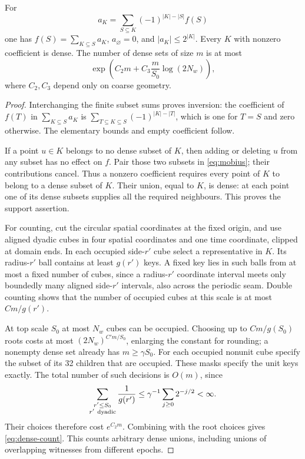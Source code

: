 \begin{lemma}
\label{lem:dense-count}
For
\begin{equation}\label{eq:mobius}
 a_K=\sum_{S\subseteq K}(-1)^{|K|-|S|}f(S)
\end{equation}
one has \(f(S)=\sum_{K\subseteq S}a_K\),
\(a_\varnothing=0\), and \(|a_K|\le2^{|K|}\).
Every \(K\) with nonzero coefficient is dense.
The number of dense sets of size \(m\) is at most
\begin{equation}\label{eq:dense-count}
 \exp\left(C_2m+C_3\frac{m}{S_0}\log(2N_w)\right),
\end{equation}
where \(C_2,C_3\) depend only on coarse geometry.
\end{lemma}
\begin{proof}
Interchanging the finite subset sums proves inversion:
the coefficient of \(f(T)\) in \(\sum_{K\subseteq S}a_K\)
is \(\sum_{T\subseteq K\subseteq S}(-1)^{|K|-|T|}\),
which is one for \(T=S\) and zero otherwise.
The elementary bounds and empty coefficient follow.

If a point \(u\in K\) belongs to no dense subset of \(K\),
then adding or deleting \(u\) from any subset has no
effect on \(f\). Pair those two subsets in
\eqref{eq:mobius}; their contributions cancel.
Thus a nonzero coefficient requires every point of \(K\)
to belong to a dense subset of \(K\).
Their union, equal to \(K\), is dense: at each point
one of its dense subsets supplies all the required
neighbours. This proves the support assertion.

For counting, cut the circular spatial coordinates at the
fixed origin, and use aligned dyadic cubes in four spatial
coordinates and one time coordinate, clipped at domain ends.
In each occupied side-\(r'\) cube select a representative
in \(K\). Its radius-\(r'\) ball contains at least \(g(r')\)
keys. A fixed key lies in such balls from at most a fixed
number of cubes, since a radius-\(r'\) coordinate interval
meets only boundedly many aligned side-\(r'\) intervals,
also across the periodic seam. Double counting shows that
the number of occupied cubes at this scale is at most
\(C m/g(r')\).

At top scale \(S_0\) at most \(N_w\) cubes can be occupied.
Choosing up to \(Cm/g(S_0)\) roots costs at most
\((2N_w)^{C'm/S_0}\), enlarging the constant for rounding;
a nonempty dense set already has \(m\ge\gamma S_0\).
For each occupied nonunit cube specify the subset of its
32 children that are occupied. These masks specify the
unit keys exactly.
The total number of such decisions is \(O(m)\), since
\[
 \sum_{\substack{r'\le S_0\\r'\ {\rm dyadic}}}
        \frac{1}{g(r')}
 \le\gamma^{-1}\sum_{j\ge0}2^{-j/2}<\infty .
\]
Their choices therefore cost \(e^{C_2m}\).
Combining with the root choices gives
\eqref{eq:dense-count}.
This counts arbitrary dense unions, including unions
of overlapping witnesses from different epochs.
\end{proof}

